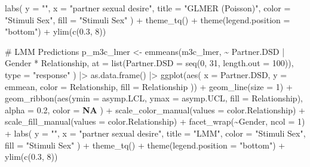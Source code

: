\documentclass[
  bookmarksnumbered]{article}
\newenvironment{Shaded}{\begin{snugshade}}{\end{snugshade}}
\newcommand{\AttributeTok}[1]{\textcolor[rgb]{0.80,0.80,0.80}{#1}}
\newcommand{\CommentTok}[1]{\textcolor[rgb]{0.50,0.62,0.50}{#1}}
\newcommand{\ConstantTok}[1]{\textcolor[rgb]{0.86,0.64,0.64}{\textbf{#1}}}
\newcommand{\DecValTok}[1]{\textcolor[rgb]{0.86,0.86,0.80}{#1}}
\newcommand{\FloatTok}[1]{\textcolor[rgb]{0.75,0.75,0.82}{#1}}
\newcommand{\FunctionTok}[1]{\textcolor[rgb]{0.94,0.94,0.56}{#1}}
\newcommand{\NormalTok}[1]{\textcolor[rgb]{0.80,0.80,0.80}{#1}}
\newcommand{\OtherTok}[1]{\textcolor[rgb]{0.94,0.94,0.56}{#1}}
\newcommand{\SpecialCharTok}[1]{\textcolor[rgb]{0.86,0.64,0.64}{#1}}
\newcommand{\StringTok}[1]{\textcolor[rgb]{0.80,0.58,0.58}{#1}}
\begin{document}
\begin{Shaded}
\begin{Highlighting}[]
  \FunctionTok{labs}\NormalTok{(}
    \AttributeTok{y =} \StringTok{""}\NormalTok{, }\AttributeTok{x =} \StringTok{"partner sexual desire"}\NormalTok{,}
    \AttributeTok{title =} \StringTok{"GLMER (Poisson)"}\NormalTok{,}
    \AttributeTok{color =} \StringTok{"Stimuli Sex"}\NormalTok{, }\AttributeTok{fill =} \StringTok{"Stimuli Sex"}
\NormalTok{  ) }\SpecialCharTok{+}
  \FunctionTok{theme\_tq}\NormalTok{() }\SpecialCharTok{+}
  \FunctionTok{theme}\NormalTok{(}\AttributeTok{legend.position =} \StringTok{"bottom"}\NormalTok{) }\SpecialCharTok{+}
  \FunctionTok{ylim}\NormalTok{(}\FunctionTok{c}\NormalTok{(}\FloatTok{0.3}\NormalTok{, }\DecValTok{8}\NormalTok{))}

\CommentTok{\# LMM Predictions}
\NormalTok{p\_m3c\_lmer }\OtherTok{\textless{}{-}} \FunctionTok{emmeans}\NormalTok{(m3c\_lmer, }\SpecialCharTok{\textasciitilde{}}\NormalTok{ Partner.DSD }\SpecialCharTok{|}\NormalTok{ Gender }\SpecialCharTok{*}\NormalTok{ Relationship,}
  \AttributeTok{at =} \FunctionTok{list}\NormalTok{(}\AttributeTok{Partner.DSD =} \FunctionTok{seq}\NormalTok{(}\DecValTok{0}\NormalTok{, }\DecValTok{31}\NormalTok{, }\AttributeTok{length.out =} \DecValTok{100}\NormalTok{)),}
  \AttributeTok{type =} \StringTok{"response"}
\NormalTok{) }\SpecialCharTok{|\textgreater{}}
  \FunctionTok{as.data.frame}\NormalTok{() }\SpecialCharTok{|\textgreater{}}
  \FunctionTok{ggplot}\NormalTok{(}\FunctionTok{aes}\NormalTok{(}
    \AttributeTok{x =}\NormalTok{ Partner.DSD, }\AttributeTok{y =}\NormalTok{ emmean,}
    \AttributeTok{color =}\NormalTok{ Relationship, }\AttributeTok{fill =}\NormalTok{ Relationship}
\NormalTok{  )) }\SpecialCharTok{+}
  \FunctionTok{geom\_line}\NormalTok{(}\AttributeTok{size =} \DecValTok{1}\NormalTok{) }\SpecialCharTok{+}
  \FunctionTok{geom\_ribbon}\NormalTok{(}\FunctionTok{aes}\NormalTok{(}\AttributeTok{ymin =}\NormalTok{ asymp.LCL, }\AttributeTok{ymax =}\NormalTok{ asymp.UCL, }\AttributeTok{fill =}\NormalTok{ Relationship),}
    \AttributeTok{alpha =} \FloatTok{0.2}\NormalTok{, }\AttributeTok{color =} \ConstantTok{NA}
\NormalTok{  ) }\SpecialCharTok{+}
  \FunctionTok{scale\_color\_manual}\NormalTok{(}\AttributeTok{values =}\NormalTok{ color.Relationship) }\SpecialCharTok{+}
  \FunctionTok{scale\_fill\_manual}\NormalTok{(}\AttributeTok{values =}\NormalTok{ color.Relationship) }\SpecialCharTok{+}
  \FunctionTok{facet\_wrap}\NormalTok{(}\SpecialCharTok{\textasciitilde{}}\NormalTok{Gender, }\AttributeTok{ncol =} \DecValTok{1}\NormalTok{) }\SpecialCharTok{+}
  \FunctionTok{labs}\NormalTok{(}
    \AttributeTok{y =} \StringTok{""}\NormalTok{, }\AttributeTok{x =} \StringTok{"partner sexual desire"}\NormalTok{,}
    \AttributeTok{title =} \StringTok{"LMM"}\NormalTok{,}
    \AttributeTok{color =} \StringTok{"Stimuli Sex"}\NormalTok{, }\AttributeTok{fill =} \StringTok{"Stimuli Sex"}
\NormalTok{  ) }\SpecialCharTok{+}
  \FunctionTok{theme\_tq}\NormalTok{() }\SpecialCharTok{+}
  \FunctionTok{theme}\NormalTok{(}\AttributeTok{legend.position =} \StringTok{"bottom"}\NormalTok{) }\SpecialCharTok{+}
  \FunctionTok{ylim}\NormalTok{(}\FunctionTok{c}\NormalTok{(}\FloatTok{0.3}\NormalTok{, }\DecValTok{8}\NormalTok{))}


\end{Highlighting}
\end{Shaded}
\end{document}
